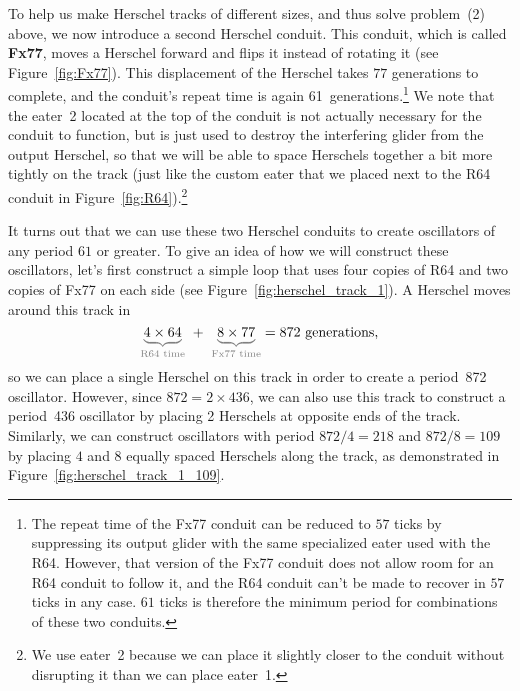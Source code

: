 To help us make Herschel tracks of different sizes, and thus solve problem~(2) above, we now introduce a second Herschel conduit. This conduit, which is called \textbf{Fx77}, moves a Herschel forward and flips it instead of rotating it (see Figure~\ref{fig:Fx77}). This displacement of the Herschel takes $77$ generations to complete, and the conduit's repeat time is again 61~generations.\footnote{The repeat time of the Fx77 conduit can be reduced to $57$ ticks by suppressing its output glider with the same specialized eater used with the R64. However, that version of the Fx77 conduit does not allow room for an R64 conduit to follow it, and the R64 conduit can't be made to recover in $57$ ticks in any case. $61$ ticks is therefore the minimum period for combinations of these two conduits.}  We note that the eater~2 located at the top of the conduit is not actually necessary for the conduit to function, but is just used to destroy the interfering glider from the output Herschel, so that we will be able to space Herschels together a bit more tightly on the track (just like the custom eater that we placed next to the R64 conduit in Figure~\ref{fig:R64}).\footnote{We use eater~2 because we can place it slightly closer to the conduit without disrupting it than we can place eater~1.}

It turns out that we can use these two Herschel conduits to create oscillators of any period $61$ or greater. To give an idea of how we will construct these oscillators, let's first construct a simple loop that uses four copies of R64 and two copies of Fx77 on each side (see Figure~\ref{fig:herschel_track_1}). A Herschel moves around this track in
\[
{\color{gray}\underbrace{\color{black}4 \times 64}_\text{R64 time}} \ + \ {\color{gray}\underbrace{\color{black}8\times 77}_\text{Fx77 time}} = 872 \text{ generations,}
\]
so we can place a single Herschel on this track in order to create a period~872 oscillator. However, since $872 = 2 \times 436$, we can also use this track to construct a period~436 oscillator by placing 2 Herschels at opposite ends of the track. Similarly, we can construct oscillators with period $872/4 = 218$ and $872/8 = 109$ by placing $4$ and $8$ equally spaced Herschels along the track, as demonstrated in Figure~\ref{fig:herschel_track_1_109}.

